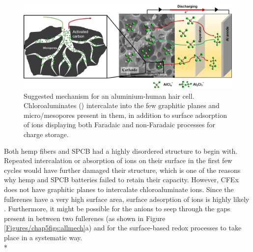
 \begin{figure}[h!]
  \centering
  \includegraphics[width=\textwidth]{Figures/chap5fig/achmech}
    \caption{Suggested mechanism for an aluminium-human hair cell. Chloroaluminates () intercalate into the few graphitic planes and micro/mesopores present in them, in addition to surface adsorption of ions displaying both Faradaic and non-Faradaic processes for charge storage.}
  \label{Figures/chap5fig:achmech}
\end{figure}

Both hemp fibers and SPCB had a highly disordered structure to begin with. Repeated intercalation or absorption of ions on their surface in the first few cycles would have further damaged their structure, which is one of the reasons why hemp and SPCB batteries failed to retain their capacity. However, CFEx does not have graphitic planes to intercalate chloroaluminate ions. Since the fullerenes have a very high surface area, surface adsorption of ions is highly likely \cite{adams_van_1994}. Furthermore, it might be possible for the anions to seep through the gaps present in between two fullerenes (as shown in Figure \ref{Figures/chap5figs:allmech}a) and for the surface-based redox processes to take place in a systematic way.\\*

